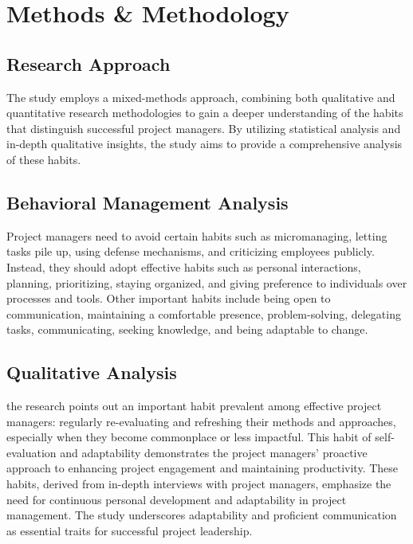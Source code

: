 \documentclass{article}
\begin{document}
\section{Methods \& Methodology}
\subsection{Research Approach}
The study employs a mixed-methods approach, combining both qualitative and quantitative research methodologies to gain a deeper understanding of the habits that distinguish successful project managers. By utilizing statistical analysis and in-depth qualitative insights, the study aims to provide a comprehensive analysis of these habits.
\subsection{Behavioral Management Analysis}
Project managers need to avoid certain habits such as micromanaging, letting tasks pile up, using defense mechanisms, and criticizing employees publicly. Instead, they should adopt effective habits such as personal interactions, planning, prioritizing, staying organized, and giving preference to individuals over processes and tools. Other important habits include being open to communication, maintaining a comfortable presence, problem-solving, delegating tasks, communicating, seeking knowledge, and being adaptable to change\cite{Patterns}.

\subsection{Qualitative Analysis}
the research points out an important habit prevalent among effective project managers: regularly re-evaluating and refreshing their methods and approaches, especially when they become commonplace or less impactful. This habit of self-evaluation and adaptability demonstrates the project managers’ proactive approach to enhancing project engagement and maintaining productivity. These habits, derived from in-depth interviews with project managers, emphasize the need for continuous personal development and adaptability in project management. The study underscores adaptability and proficient communication as essential traits for successful project leadership\cite{Patterns}.
\end{document}
